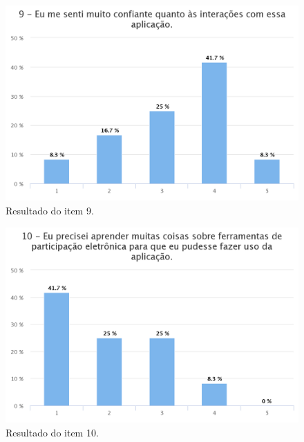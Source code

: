 \begin{figure}[!ht]
    \centering
    \includegraphics[scale=0.3]{./figuras/q9-hc.png}
    \caption{Resultado do item 9.}
    \label{fig:q9}
\end{figure}

\begin{figure}[!ht]
    \centering
    \includegraphics[scale=0.3]{./figuras/q10-hc.png}
    \caption{Resultado do item 10.}
    \label{fig:q10}
\end{figure}